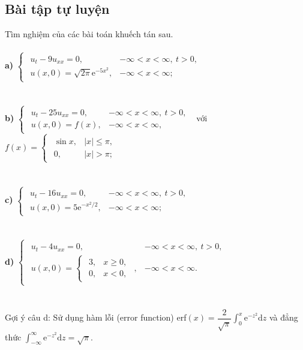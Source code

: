 \documentclass[10pt, a4paper]{article}
\begin{document}
	\subsection{Bài tập tự luyện}
	Tìm nghiệm của các bài toán khuếch tán sau.\\\\
	\textbf{a) }$\begin{cases}
		\begin{array}{ll}
			u_t-9u_{xx}=0, & -\infty<x<\infty,~t>0,\\
			u(x,0)=\sqrt{2\pi}\mathrm e^{-5x^2}, & -\infty<x<\infty;
		\end{array}
	\end{cases}$\\\\\\
	\textbf{b) }$\begin{cases}
		\begin{array}{ll}
			u_t-25u_{xx}=0, & -\infty<x<\infty,~t>0,\\
			u(x,0)=f(x), & -\infty<x<\infty,
		\end{array}
	\end{cases}$ với $f(x)=\begin{cases}
		\begin{array}{ll}
			\sin x, & |x|\le\pi,\\
			0, & |x|>\pi;
		\end{array}
	\end{cases}$\\\\\\
	\textbf{c) }$\begin{cases}
		\begin{array}{ll}
			u_t-16u_{xx}=0, & -\infty<x<\infty,~t>0,\\
			u(x,0)=5\mathrm e^{-x^2/2}, & -\infty<x<\infty;
		\end{array}
	\end{cases}$\\\\\\
	\textbf{d) }$\begin{cases}
	\begin{array}{ll}
		u_t-4u_{xx}=0, & -\infty<x<\infty,~t>0,\\
		u(x,0)=\begin{cases}
		\begin{array}{ll}
			3, & x\ge0,\\
			0, & x<0,
		\end{array}
		\end{cases}, & -\infty<x<\infty.
	\end{array}
	\end{cases}$\\\\\\
	Gợi ý câu d: Sử dụng hàm lỗi (error function) erf$(x)=\dfrac{2}{\sqrt\pi}\displaystyle\int_0^x\mathrm e^{-z^2}\mathrm dz$ và đẳng thức $\displaystyle\int_{-\infty}^{\infty}\mathrm e^{-z^2}\mathrm dz=\sqrt\pi$.
	\newpage
\end{document}
